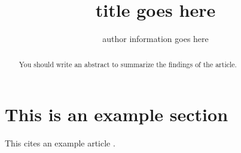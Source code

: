 \documentclass[10pt,a4paper]{article}
\title{title goes here}
\author{author information goes here}
\begin{document}
\maketitle
\begin{abstract}
You should write an abstract to summarize the findings of the article.
\end{abstract}
\tableofcontents
\section{This is an example section}
This cites an example article \cite{example_article}.


\end{document}
